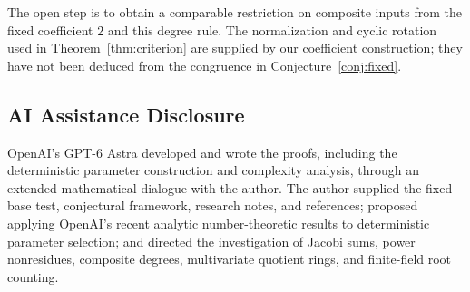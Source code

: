 \documentclass[11pt]{article}
\theoremstyle{definition}
\theoremstyle{remark}
\begin{document}
The open step is to obtain a comparable restriction on composite
inputs from the fixed coefficient $2$ and this degree rule. The
normalization and cyclic rotation used in Theorem~\ref{thm:criterion}
are supplied by our coefficient construction; they have not been
deduced from the congruence in Conjecture~\ref{conj:fixed}.

\begin{samepage}
\section*{AI Assistance Disclosure}

OpenAI's GPT-6 Astra developed and wrote the proofs, including the
deterministic parameter construction and complexity analysis, through
an extended mathematical dialogue with the author. The author supplied
the fixed-base test, conjectural framework, research notes, and
references; proposed applying OpenAI's recent analytic number-theoretic
results to deterministic parameter selection; and directed the
investigation of Jacobi sums, power nonresidues, composite degrees, multivariate
quotient rings, and finite-field root counting.
\end{samepage}
\end{document}
